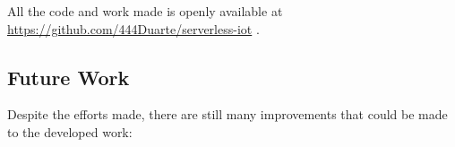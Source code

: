 \documentclass[conference]{IEEEtran}
\begin{document}
All the code and work made is openly available at \url{https://github.com/444Duarte/serverless-iot} .








\subsection{Future Work}
Despite the efforts made, there are still many improvements that could be made to
the developed work:
\end{document}

